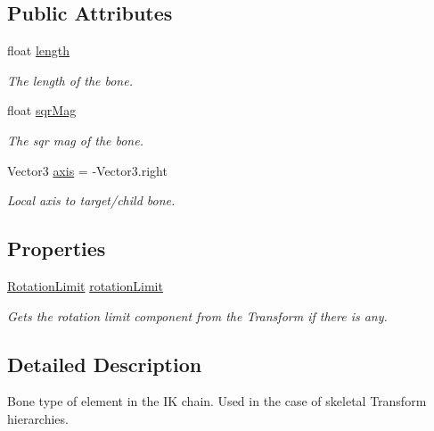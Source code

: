 \subsection*{Public Attributes}
\begin{DoxyCompactItemize}
\item 
float \mbox{\hyperlink{class_root_motion_1_1_final_i_k_1_1_i_k_solver_1_1_bone_a4af5ffe791c7618297148be7ede5e027}{length}}
\begin{DoxyCompactList}\small\item\em The length of the bone. \end{DoxyCompactList}\item 
float \mbox{\hyperlink{class_root_motion_1_1_final_i_k_1_1_i_k_solver_1_1_bone_ac59a4162b58836089a1dd6fa4cfde222}{sqr\+Mag}}
\begin{DoxyCompactList}\small\item\em The sqr mag of the bone. \end{DoxyCompactList}\item 
Vector3 \mbox{\hyperlink{class_root_motion_1_1_final_i_k_1_1_i_k_solver_1_1_bone_a5a04ae5c106422f65c37c5da86832749}{axis}} = -\/Vector3.\+right
\begin{DoxyCompactList}\small\item\em Local axis to target/child bone. \end{DoxyCompactList}\end{DoxyCompactItemize}
\subsection*{Properties}
\begin{DoxyCompactItemize}
\item 
\mbox{\hyperlink{class_root_motion_1_1_final_i_k_1_1_rotation_limit}{Rotation\+Limit}} \mbox{\hyperlink{class_root_motion_1_1_final_i_k_1_1_i_k_solver_1_1_bone_a569ab957aabad72b16e0b16004a648db}{rotation\+Limit}}
\begin{DoxyCompactList}\small\item\em Gets the rotation limit component from the Transform if there is any. \end{DoxyCompactList}\end{DoxyCompactItemize}


\subsection{Detailed Description}
Bone type of element in the IK chain. Used in the case of skeletal Transform hierarchies. 




